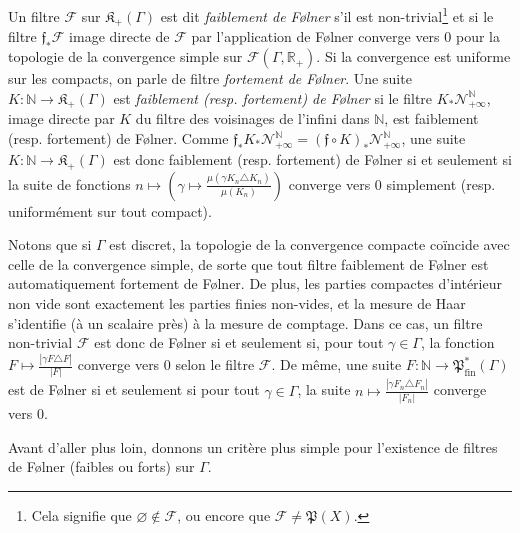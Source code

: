 \documentclass[a4paper,12pt]{article}
\newcommand{\R}{\mathbb{R}}
\newcommand{\N}{\mathbb{N}}
\newcommand{\abs}[1]{\left\vert#1\right\vert}
\newcommand{\card}[1]{\abs{#1}}
\newcommand{\ssi}{si et seulement si }
\newcommand{\comp}{\circ}
\newcommand{\nhds}{\mathcal{N}}
\newcommand{\parts}{\mathfrak{P}}
\newcommand{\finparts}{\mathfrak{P}_{\mathrm{fin}}}
\begin{document}
Un filtre $\mathscr{F}$ sur $\mathfrak{K}_+(\Gamma)$ est dit \emph{faiblement de F\o{}lner} s'il est non-trivial\footnote{Cela signifie que $\varnothing\notin\mathscr{F}$,
ou encore que $\mathscr{F}\ne\parts(X)$.} et si le filtre $\mathfrak{f}_*\mathscr{F}$ image directe 
de $\mathscr{F}$ par l'application de F\o{}lner converge vers $0$ pour la topologie de la convergence simple sur $\mathcal{F}(\Gamma, \R_+)$. 
Si la convergence est uniforme sur les compacts, on parle de filtre \emph{fortement de F\o{}lner}.
Une suite $K:\N\to\mathfrak{K}_+(\Gamma)$ est \emph{faiblement (resp. fortement) de F\o{}lner} si le filtre $K_*\nhds_{+\infty}^\N$, image directe par $K$ du filtre des
voisinages de l'infini dans $\N$, est faiblement (resp. fortement) de F\o{}lner. Comme $\mathfrak{f}_*K_*\nhds_{+\infty}^\N = (\mathfrak{f}\comp K)_*\nhds_{+\infty}^\N$,
une suite $K:\N\to\mathfrak{K}_+(\Gamma)$ est donc faiblement (resp. fortement) de F\o{}lner \ssi la suite de fonctions
$n\mapsto\left(\gamma\mapsto\frac{\mu(\gamma K_n\triangle K_n)}{\mu(K_n)}\right)$ converge vers $0$ simplement 
(resp. uniformément sur tout compact).

Notons que si $\Gamma$ est discret, 
la topologie de la convergence compacte coïncide avec celle de la convergence simple, de sorte que tout filtre 
faiblement de F\o{}lner est automatiquement fortement de F\o{}lner.
De plus, les parties compactes d'intérieur non vide sont exactement les parties finies non-vides,
et la mesure de Haar s'identifie (à un scalaire près) à la mesure de comptage. Dans ce cas, un filtre non-trivial $\mathscr{F}$
est donc de F\o{}lner si et seulement si, pour tout $\gamma\in\Gamma$, la fonction $F\mapsto \frac{\card{\gamma F\triangle F}}{\card{F}}$ 
converge vers $0$ selon le filtre $\mathscr{F}$. De même, une suite $F:\N\to\finparts^*(\Gamma)$
est de F\o{}lner \ssi pour tout $\gamma\in\Gamma$, la suite $n\mapsto\frac{\card{\gamma F_n\triangle F_n}}{\card{F_n}}$ converge 
vers $0$.

Avant d'aller plus loin, donnons un critère plus simple pour l'existence de filtres de F\o{}lner (faibles ou forts) sur $\Gamma$.
\end{document}
